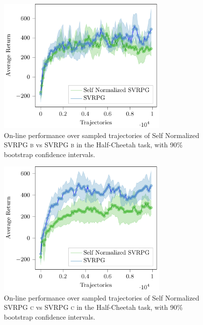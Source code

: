 \begin{figure}[h]
	\begin{minipage}[h]{1\textwidth}
		\centering
		\includegraphics[width=0.75\textwidth]{Images/Experiments/half_cheetah_SVRPG_vs_SN_SVRPG_B.pdf}
		\vspace{-0.1in}
		\caption{On-line performance over sampled trajectories of Self Normalized \acs{SVRPG} \textsc{b} vs \acs{SVRPG} \textsc{b} in the Half-Cheetah task, with 90\% bootstrap confidence intervals.}
		\label{fig:hcseven}
	\end{minipage}
	\vspace{-0.15in}
\end{figure}
\begin{figure}[h]
	\begin{minipage}[h]{1\textwidth}
		\centering
		\includegraphics[width=0.75\textwidth]{Images/Experiments/half_cheetah_SVRPG_vs_SN_SVRPG_C.pdf}
		\vspace{-0.1in}
		\caption{On-line performance over sampled trajectories of Self Normalized \acs{SVRPG} \textsc{c} vs \acs{SVRPG} \textsc{c} in the Half-Cheetah task, with 90\% bootstrap confidence intervals.}
		\label{fig:hcheight}
	\end{minipage}
	\vspace{-0.15in}
\end{figure}

